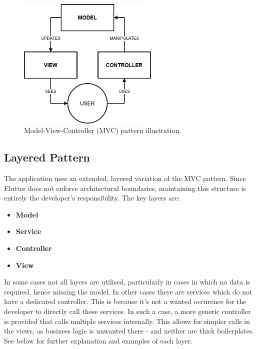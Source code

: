 \documentclass[
  digital,     %
  oneside,     %
  nosansbold,  %
  nocolorbold, %
  lof,         %
  lot,         %
]{fithesis4}
\begin{document}
\begin{figure}[H]
    \centering
    \includegraphics[width=0.6\textwidth]{assets/diagrams/mvc.drawio.png}
    \caption[Model-View-Controller pattern]{Model-View-Controller (\gls{MVC}) pattern illustration.}
    \label{fig:mvc-pattern}
\end{figure}

\subsection{Layered Pattern}

The application uses an extended, layered variation of the \gls{MVC} pattern. Since Flutter does not enforce architectural boundaries, maintaining this structure is entirely the developer's responsibility. The key layers are:

\begin{itemize}
    \item \textbf{Model}
    \item \textbf{Service}
    \item \textbf{Controller}
    \item \textbf{View}
\end{itemize}

In some cases not all layers are utilised, particularly in cases in which no data is required, hence missing the model. In other cases there are services which do not have a dedicated controller. This is because it's not a wanted occurence for the developer to directly call these services. In such a case, a more generic controller is provided that calls multiple services internally. This allows for simpler calls in the views, as business logic is unwanted there - and neither are thick boilerplates. See below for further explanation and examples of each layer.
\end{document}
